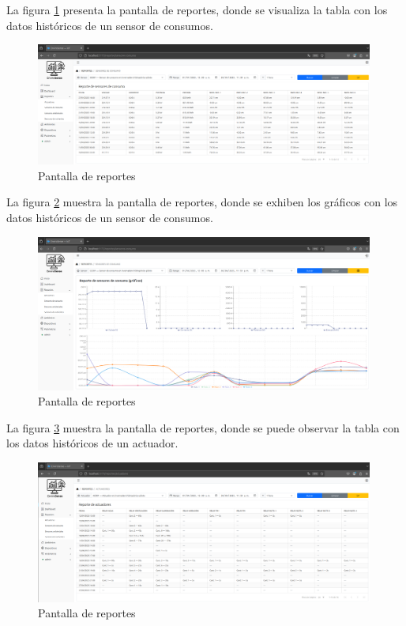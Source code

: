 La figura \ref{fig:reportes_tabla_consumos} presenta la pantalla de reportes,
donde se visualiza la tabla con los datos históricos de un sensor de consumos.

\begin{figure}[H]
    \centering
    \includegraphics[width=0.99\textwidth]{./Images/28_reportes_1.png}
    \caption{Pantalla de reportes}
    \label{fig:reportes_tabla_consumos}
\end{figure}

La figura \ref{fig:reportes_graficos_consumos} muestra la pantalla de reportes,
donde se exhiben los gráficos con los datos históricos de un sensor de
consumos.

\begin{figure}[H]
    \centering
    \includegraphics[width=0.99\textwidth]{./Images/28_reportes_2.png}
    \caption{Pantalla de reportes}
    \label{fig:reportes_graficos_consumos}
\end{figure}

La figura \ref{fig:reportes_tabla_actuadores} muestra la pantalla de reportes,
donde se puede observar la tabla con los datos históricos de un actuador.

\begin{figure}[H]
    \centering
    \includegraphics[width=0.99\textwidth]{./Images/28_reportes_3.png}
    \caption{Pantalla de reportes}
    \label{fig:reportes_tabla_actuadores}
\end{figure}

